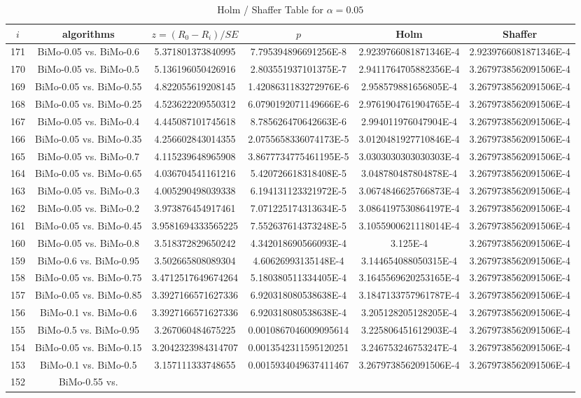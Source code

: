 \documentclass[a4paper,10pt]{article}
\begin{document}
\begin{landscape}
\begin{table}[!htp]
\centering\tiny
\caption{Holm / Shaffer Table for $\alpha=0.05$}
\begin{tabular}{cccccc}
$i$&algorithms&$z=(R_0 - R_i)/SE$&$p$&Holm&Shaffer\\
\hline
171&BiMo-0.05 vs. BiMo-0.6&5.371801373840995&7.795394896691256E-8&2.9239766081871346E-4&2.9239766081871346E-4\\170&BiMo-0.05 vs. BiMo-0.5&5.136196050426916&2.803551937101375E-7&2.9411764705882356E-4&3.2679738562091506E-4\\169&BiMo-0.05 vs. BiMo-0.55&4.822055619208145&1.4208631183272976E-6&2.958579881656805E-4&3.2679738562091506E-4\\168&BiMo-0.05 vs. BiMo-0.25&4.523622209550312&6.0790192071149666E-6&2.9761904761904765E-4&3.2679738562091506E-4\\167&BiMo-0.05 vs. BiMo-0.4&4.445087101745618&8.785626470642663E-6&2.994011976047904E-4&3.2679738562091506E-4\\166&BiMo-0.05 vs. BiMo-0.35&4.256602843014355&2.0755658336074173E-5&3.0120481927710846E-4&3.2679738562091506E-4\\165&BiMo-0.05 vs. BiMo-0.7&4.115239648965908&3.8677734775461195E-5&3.0303030303030303E-4&3.2679738562091506E-4\\164&BiMo-0.05 vs. BiMo-0.65&4.036704541161216&5.420726618318408E-5&3.048780487804878E-4&3.2679738562091506E-4\\163&BiMo-0.05 vs. BiMo-0.3&4.005290498039338&6.194131123321972E-5&3.0674846625766873E-4&3.2679738562091506E-4\\162&BiMo-0.05 vs. BiMo-0.2&3.973876454917461&7.071225174313634E-5&3.0864197530864197E-4&3.2679738562091506E-4\\161&BiMo-0.05 vs. BiMo-0.45&3.9581694333565225&7.552637614373248E-5&3.1055900621118014E-4&3.2679738562091506E-4\\160&BiMo-0.05 vs. BiMo-0.8&3.518372829650242&4.342018690566093E-4&3.125E-4&3.2679738562091506E-4\\159&BiMo-0.6 vs. BiMo-0.95&3.502665808089304&4.60626993135148E-4&3.144654088050315E-4&3.2679738562091506E-4\\158&BiMo-0.05 vs. BiMo-0.75&3.4712517649674264&5.180380511334405E-4&3.1645569620253165E-4&3.2679738562091506E-4\\157&BiMo-0.05 vs. BiMo-0.85&3.3927166571627336&6.920318080538638E-4&3.1847133757961787E-4&3.2679738562091506E-4\\156&BiMo-0.1 vs. BiMo-0.6&3.3927166571627336&6.920318080538638E-4&3.205128205128205E-4&3.2679738562091506E-4\\155&BiMo-0.5 vs. BiMo-0.95&3.267060484675225&0.0010867046009095614&3.225806451612903E-4&3.2679738562091506E-4\\154&BiMo-0.05 vs. BiMo-0.15&3.2042323984314707&0.0013542311595120251&3.246753246753247E-4&3.2679738562091506E-4\\153&BiMo-0.1 vs. BiMo-0.5&3.157111333748655&0.0015934049637411467&3.2679738562091506E-4&3.2679738562091506E-4\\152&BiMo-0.55 vs. 
\end{tabular}
\end{table}
\end{landscape}
\end{document}
